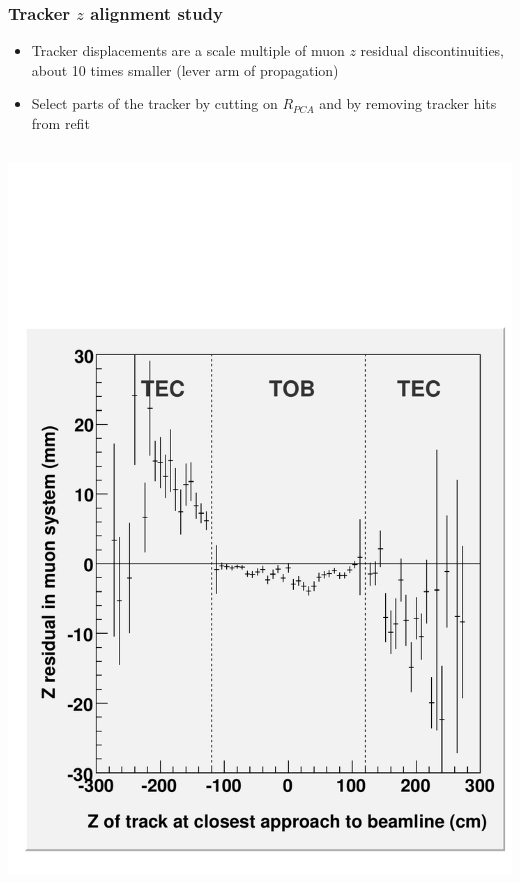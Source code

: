 \documentclass[compress]{beamer}
\begin{document}
\begin{frame}
\frametitle{Tracker $z$ alignment study}

\begin{itemize}
\item Tracker displacements are a scale multiple of muon $z$ residual discontinuities, about 10 times smaller (lever arm of propagation)
\item Select parts of the tracker by cutting on $R_{PCA}$ and by removing tracker hits from refit
\end{itemize}

\vfill
\begin{columns}
\includegraphics[width=\linewidth]{zresid_from_tracker_outerbottom.pdf}


\end{columns}
\end{frame}
\end{document}
